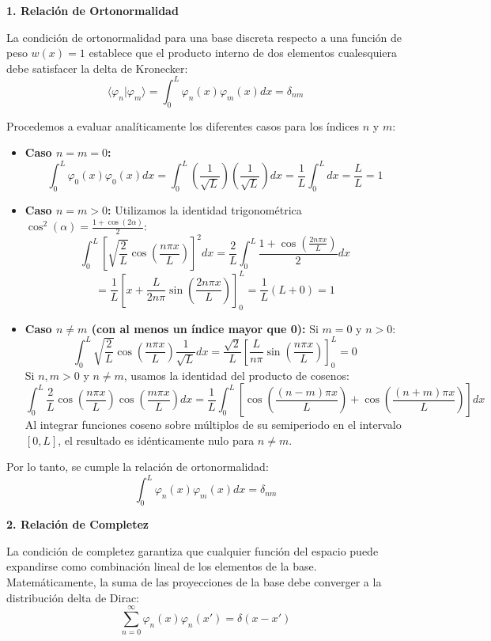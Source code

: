 \documentclass[a4paper]{article}
\begin{document}
\textbf{1. Relación de Ortonormalidad}

La condición de ortonormalidad para una base discreta respecto a una función de peso $w(x) = 1$ establece que el producto interno de dos elementos cualesquiera debe satisfacer la delta de Kronecker:
$$ \langle \varphi_n | \varphi_m \rangle = \int_{0}^{L} \varphi_n(x) \varphi_m(x) dx = \delta_{nm} $$

Procedemos a evaluar analíticamente los diferentes casos para los índices $n$ y $m$:

\begin{itemize}
    \item \textbf{Caso $n = m = 0$:}
    $$ \int_{0}^{L} \varphi_0(x) \varphi_0(x) dx = \int_{0}^{L} \left( \frac{1}{\sqrt{L}} \right) \left( \frac{1}{\sqrt{L}} \right) dx = \frac{1}{L} \int_{0}^{L} dx = \frac{L}{L} = 1 $$
    
    \item \textbf{Caso $n = m > 0$:}
    Utilizamos la identidad trigonométrica $\cos^2(\alpha) = \frac{1 + \cos(2\alpha)}{2}$:
    $$ \int_{0}^{L} \left[ \sqrt{\frac{2}{L}} \cos\left(\frac{n\pi x}{L}\right) \right]^2 dx = \frac{2}{L} \int_{0}^{L} \frac{1 + \cos\left(\frac{2n\pi x}{L}\right)}{2} dx $$
    $$ = \frac{1}{L} \left[ x + \frac{L}{2n\pi} \sin\left(\frac{2n\pi x}{L}\right) \right]_{0}^{L} = \frac{1}{L} (L + 0) = 1 $$

    \item \textbf{Caso $n \neq m$ (con al menos un índice mayor que 0):}
    Si $m = 0$ y $n > 0$:
    $$ \int_{0}^{L} \sqrt{\frac{2}{L}} \cos\left(\frac{n\pi x}{L}\right) \frac{1}{\sqrt{L}} dx = \frac{\sqrt{2}}{L} \left[ \frac{L}{n\pi} \sin\left(\frac{n\pi x}{L}\right) \right]_{0}^{L} = 0 $$
    Si $n, m > 0$ y $n \neq m$, usamos la identidad del producto de cosenos:
    $$ \int_{0}^{L} \frac{2}{L} \cos\left(\frac{n\pi x}{L}\right) \cos\left(\frac{m\pi x}{L}\right) dx = \frac{1}{L} \int_{0}^{L} \left[ \cos\left(\frac{(n-m)\pi x}{L}\right) + \cos\left(\frac{(n+m)\pi x}{L}\right) \right] dx $$
    Al integrar funciones coseno sobre múltiplos de su semiperiodo en el intervalo $[0, L]$, el resultado es idénticamente nulo para $n \neq m$.
\end{itemize}

Por lo tanto, se cumple la relación de ortonormalidad:
$$ \int_{0}^{L} \varphi_n(x) \varphi_m(x) dx = \delta_{nm} $$

\textbf{2. Relación de Completez}

La condición de completez garantiza que cualquier función del espacio puede expandirse como combinación lineal de los elementos de la base. Matemáticamente, la suma de las proyecciones de la base debe converger a la distribución delta de Dirac:
$$ \sum_{n=0}^{\infty} \varphi_n(x) \varphi_n(x') = \delta(x - x') $$
\end{document}
